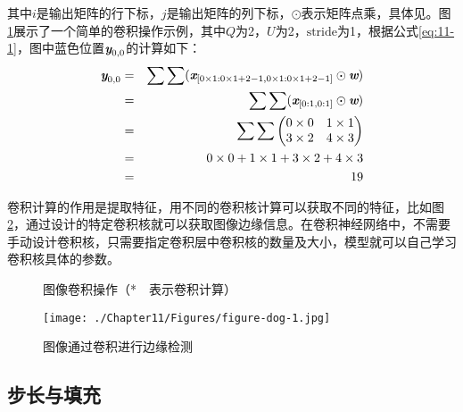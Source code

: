 \noindent 其中$i$是输出矩阵的行下标，$j$是输出矩阵的列下标，$\odot$表示矩阵点乘，具体见{\chapternine}。图\ref{fig:11-4}展示了一个简单的卷积操作示例，其中$Q$为2，$U$为2，$\textrm{stride}$为1，根据公式\eqref{eq:11-1}，图中蓝色位置$\textbf{\em y}_{0,0}$的计算如下：
\begin{eqnarray}
\textbf{\em y}_{0,0} &=& \sum \sum ( \textbf{\em x}_{[0\times 1:0\times 1+2-1,0\times 1:0\times 1+2-1]} \odot \textbf{\em w}) \nonumber \\
			 &=& \sum \sum ( \textbf{\em x}_{[0:1,0:1]} \odot \textbf{\em w} ) \nonumber \\
&=& \sum \sum \begin{pmatrix}
   0\times 0 & 1\times1\\
   3\times2 & 4\times3
\end{pmatrix} \nonumber \\
			 &=& 0 \times 0 + 1 \times 1 + 3 \times 2 + 4 \times 3 \nonumber \\
			 &=& 19
\label{eq:11-2}
\end{eqnarray}

\parinterval 卷积计算的作用是提取特征，用不同的卷积核计算可以获取不同的特征，比如图\ref{fig:11-5}，通过设计的特定卷积核就可以获取图像边缘信息。在卷积神经网络中，不需要手动设计卷积核，只需要指定卷积层中卷积核的数量及大小，模型就可以自己学习卷积核具体的参数。

\begin{figure}[htp]
\centering

\caption{图像卷积操作（*\ \ 表示卷积计算）}
\label{fig:11-4}
\end{figure}


\begin{figure}[htp]
\centering
%
\texttt{[image: ./Chapter11/Figures/figure-dog-1.jpg]}
\caption{图像通过卷积进行边缘检测}
\label{fig:11-5}
\end{figure}

\vspace{-2em}
\subsection{步长与填充}

